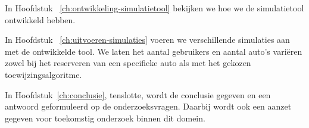 In Hoofdstuk ~\ref{ch:ontwikkeling-simulatietool} bekijken we hoe we de simulatietool ontwikkeld hebben.

In Hoofdstuk ~\ref{ch:uitvoeren-simulaties} voeren we verschillende simulaties aan met de ontwikkelde tool. We laten het aantal gebruikers en aantal auto's variëren zowel bij het reserveren van een specifieke auto als met het gekozen toewijzingsalgoritme. 


In Hoofdstuk~\ref{ch:conclusie}, tenslotte, wordt de conclusie gegeven en een antwoord geformuleerd op de onderzoeksvragen. Daarbij wordt ook een aanzet gegeven voor toekomstig onderzoek binnen dit domein.